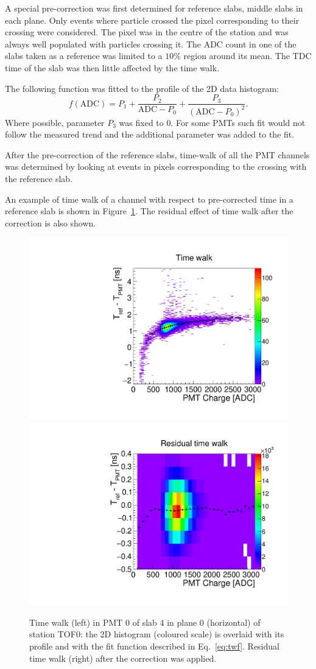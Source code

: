 A special pre-correction was first determined for reference slabs,
middle slabs in each plane. Only events where particle crossed the
pixel corresponding to their crossing were considered. The pixel
was in the centre of the station and was always well populated with
particles crossing it.  The ADC count in one of the slabs taken as a
reference was limited to a $10\%$ region around its mean. The TDC time
of the slab was then little affected by the time walk.

The following function was fitted to the profile of the 2D data histogram:
%
\begin{equation}
  \newcommand{\ADC}{\text{ADC}}
  \label{eq:twf}
  f(\ADC) = P_1 + \frac{P_2}{\ADC - P_0} + \frac{P_3}{\left(\ADC - P_0\right)^2}.
\end{equation}
%
Where possible, parameter $P_3$ was fixed to 0. For some PMTs such fit
would not follow the measured trend and the additional parameter was
added to the fit.

After the pre-correction of the reference slabs, time-walk of all the
PMT channels was determined by looking at events in pixels
corresponding to the crossing with the reference slab.

An example of time walk of a channel with respect to pre-corrected
time in a reference slab is shown in Figure~\ref{fig:TW}. The residual
effect of time walk after the correction is also shown.

\begin{figure}
  \begin{center}
  \includegraphics[width=0.45\columnwidth]{01_tw_example}
  \includegraphics[width=0.45\columnwidth]{03_residual_tw_example} \\
  \caption{Time walk (left) in PMT 0 of slab 4 in plane 0 (horizontal)
    of station TOF0: the 2D histogram (coloured scale) is overlaid
    with its profile and with the fit function described in
    Eq.~\ref{eq:twf}. Residual time walk (right) after the
    correction was applied.  }
  \label{fig:TW}
  \end{center}
\end{figure}



